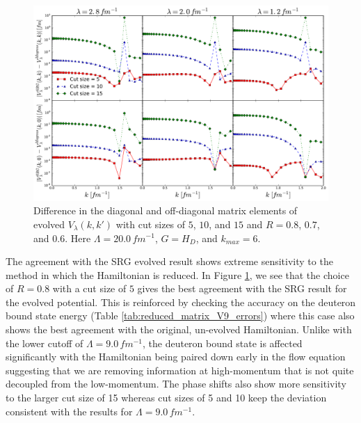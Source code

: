 \documentclass[preprintnumbers,floatfix,aps,prc,preprint]{revtex4-1}
\begin{document}
%
\begin{figure}[H]
  \centering
  \includegraphics[width=15cm]{reduced_matrix_mag_diff_V20}
   \hspace*{0.05\textwidth}%
  \caption{Difference in the diagonal and off-diagonal matrix elements of evolved $V_{\lambda}(k,k')$ with cut sizes of $5$, $10$, and $15$ and $R=0.8$, $0.7$, and $0.6$. Here $\Lambda=20.0 \, fm^{-1}$, $G=H_D$, and $k_{max}=6$.}
  \label{fig:reduced_matrix_mag_diff_V20}
\end{figure}
%
The agreement with the SRG evolved result shows extreme sensitivity to the method in which the Hamiltonian is reduced. In Figure \ref{fig:reduced_matrix_mag_diff_V20}, we see that the choice of $R=0.8$ with a cut size of $5$ gives the best agreement with the SRG result for the evolved potential. This is reinforced by checking the accuracy on the deuteron bound state energy (Table \ref{tab:reduced_matrix_V9_errors}) where this case also shows the best agreement with the original, un-evolved Hamiltonian. Unlike with the lower cutoff of $\Lambda = 9.0 \, fm^{-1}$, the deuteron bound state is affected significantly with the Hamiltonian being paired down early in the flow equation suggesting that we are removing information at high-momentum that is not quite decoupled from the low-momentum. The phase shifts also show more sensitivity to the larger cut size of 15 whereas cut sizes of 5 and 10 keep the deviation consistent with the results for $\Lambda = 9.0 \, fm^{-1}$.
%
\end{document}
